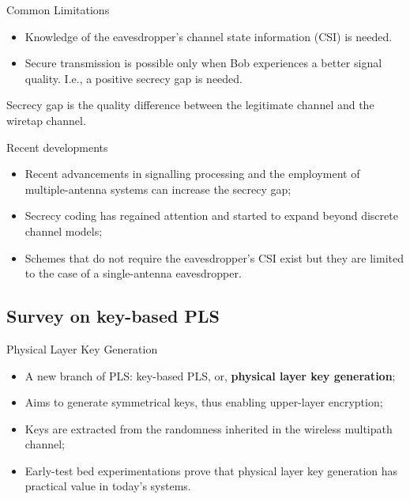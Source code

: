 \begin{frame}{Common Limitations}
\begin{itemize}
    \item Knowledge of the eavesdropper's channel state information (CSI) is needed. 
    \item Secure transmission is possible only when Bob experiences a better signal quality. I.e., a positive secrecy gap is needed.
\end{itemize}

\begin{definition}
    Secrecy gap is the quality difference between the legitimate channel and the wiretap channel. 
\end{definition}

\end{frame}

\begin{frame}{Recent developments}
\begin{itemize}
\item Recent advancements in signalling processing and the employment of multiple-antenna systems  can increase the secrecy gap;

\item Secrecy coding has regained attention and started to expand beyond discrete channel models;

\item Schemes that do not require the eavesdropper’s CSI exist but they are
limited to the case of a single-antenna eavesdropper.
\end{itemize}
    
\end{frame}


\subsection{Survey on key-based PLS}

\begin{frame}{Physical Layer Key Generation}
    \begin{itemize}
        \item A new branch of PLS: key-based PLS, or, \textbf{physical layer key generation};
        \item Aims to generate symmetrical keys, thus enabling upper-layer encryption;
        \item Keys are extracted from the randomness inherited in the wireless multipath channel; 
        \item Early-test bed experimentations prove that physical layer key generation has practical value in today's systems.  
    \end{itemize}
\end{frame}

